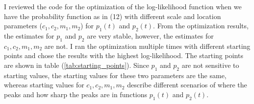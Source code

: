 \documentclass[11pt]{article}
\begin{document}
I reviewed the code for the optimization of the log-likelihood function when we have the probability function as in (12) with different scale and location parameters ($c_1, c_2, m_1, m_2$) for $p_1(t)$ and $p_2(t)$. From the optimization results, the estimates for $p_1$ and $p_2$ are very stable, however, the estimates for $c_1, c_2, m_1, m_2$ are not. I ran the optimization multiple times with different starting points and chose the results with the highest log-likelihood. The starting points are shown in table (\ref{tab:starting_points}). Since $p_1$ and $p_2$ are not sensitive to starting values, the starting values for these two parameters are the same, whereas starting values for $c_1, c_2, m_1, m_2$ describe different scenarios of where the peaks and how sharp the peaks are in functions $p_1(t)$ and $p_2(t)$.
\end{document}

